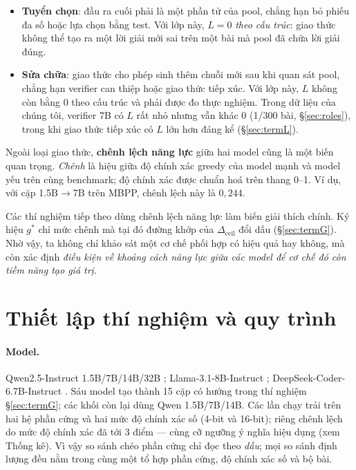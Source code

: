 \documentclass[11pt,a4paper]{article}
\newcommand{\dceil}{\Delta_{\mathrm{ceil}}}
\begin{document}
\begin{itemize}\itemsep1pt
\item \textbf{Tuyển chọn}: đầu ra cuối phải là một phần tử của pool, chẳng hạn bỏ phiếu đa số
      hoặc lựa chọn bằng test. Với lớp này, $L=0$ \emph{theo cấu trúc}: giao thức không thể tạo
      ra một lời giải mới sai trên một bài mà pool đã chứa lời giải đúng.
\item \textbf{Sửa chữa}: giao thức cho phép sinh thêm chuỗi mới sau khi quan sát pool, chẳng
      hạn verifier can thiệp hoặc giao thức tiếp xúc. Với lớp này, $L$ không còn bằng 0 theo
      cấu trúc và phải được đo thực nghiệm. Trong dữ liệu của chúng tôi, verifier 7B có $L$ rất
      nhỏ nhưng vẫn khác 0 (1/300 bài, \S\ref{sec:roles}), trong khi giao thức tiếp xúc có $L$
      lớn hơn đáng kể (\S\ref{sec:termL}).
\end{itemize}

Ngoài loại giao thức, \textbf{chênh lệch năng lực} giữa hai model cũng là một biến quan trọng.
\emph{Chênh} là hiệu giữa độ chính xác greedy của model mạnh và model yếu trên cùng benchmark;
độ chính xác được chuẩn hoá trên thang 0--1. Ví dụ, với cặp 1.5B$\to$7B trên MBPP, chênh lệch
này là $0{,}244$.

Các thí nghiệm tiếp theo dùng chênh lệch năng lực làm biến giải thích chính. Ký hiệu $g^\ast$
chỉ mức chênh mà tại đó đường khớp của $\dceil$ đổi dấu (\S\ref{sec:termG}). Nhờ vậy, ta không
chỉ khảo sát một cơ chế phối hợp có hiệu quả hay không, mà còn xác định \emph{điều kiện về
khoảng cách năng lực giữa các model để cơ chế đó còn tiềm năng tạo giá trị}.


\section{Thiết lập thí nghiệm và quy trình}\label{sec:setup}


\paragraph{Model.} Qwen2.5-Instruct 1.5B/7B/14B/32B \cite{yang2024}; Llama-3.1-8B-Instruct
\cite{grattafiori2024}; DeepSeek-Coder-6.7B-Instruct \cite{guo2024}. Sáu model tạo thành 15 cặp
có hướng trong thí nghiệm \S\ref{sec:termG}; các khối còn lại dùng Qwen 1.5B/7B/14B. Các lần
chạy trải trên hai hệ phần cứng và hai mức độ chính xác số (4-bit và 16-bit); riêng chênh lệch
do mức độ chính xác đã tới 3 điểm --- cùng cỡ ngưỡng ý nghĩa hiệu dụng (xem Thống kê). Vì vậy
so sánh chéo phần cứng chỉ đọc theo \emph{dấu}; mọi so sánh định lượng đều nằm trong cùng một
tổ hợp phần cứng, độ chính xác số và bộ bài.
\end{document}
